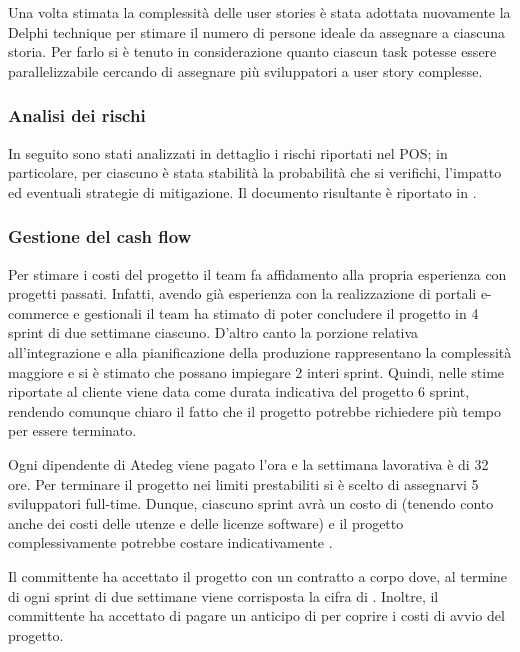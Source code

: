 Una volta stimata la complessità delle user stories è stata adottata nuovamente la Delphi technique per stimare il numero di persone ideale da assegnare a ciascuna storia. Per farlo si è tenuto in considerazione quanto ciascun task potesse essere parallelizzabile cercando di assegnare più sviluppatori a user story complesse.

\subsubsection{Analisi dei rischi}
In seguito sono stati analizzati in dettaglio i rischi riportati nel POS; in particolare, per ciascuno è stata stabilità la probabilità che si verifichi, l'impatto ed eventuali strategie di mitigazione. Il documento risultante è riportato in .

\subsubsection{Gestione del cash flow}
Per stimare i costi del progetto il team fa affidamento alla propria esperienza con progetti passati. Infatti, avendo già esperienza con la realizzazione di portali e-commerce e gestionali il team ha stimato di poter concludere il progetto in 4 sprint di due settimane ciascuno. D'altro canto la porzione relativa all'integrazione e alla pianificazione della produzione rappresentano la complessità maggiore e si è stimato che possano impiegare 2 interi sprint.
Quindi, nelle stime riportate al cliente viene data come durata indicativa del progetto 6 sprint, rendendo comunque chiaro il fatto che il progetto potrebbe richiedere più tempo per essere terminato.

Ogni dipendente di Atedeg viene pagato  l'ora e la settimana lavorativa è di 32 ore. Per terminare il progetto nei limiti prestabiliti si è scelto di assegnarvi 5 sviluppatori full-time. Dunque, ciascuno sprint avrà un costo di  (tenendo conto anche dei costi delle utenze e delle licenze software) e il progetto complessivamente potrebbe costare indicativamente .

Il committente ha accettato il progetto con un contratto a corpo dove, al termine di ogni sprint di due settimane viene corrisposta la cifra di .
Inoltre, il committente ha accettato di pagare un anticipo di  per coprire i costi di avvio del progetto.
